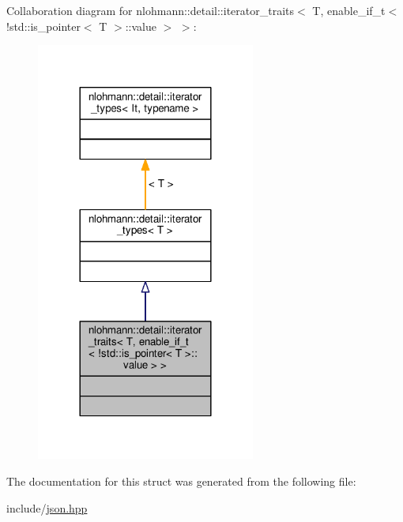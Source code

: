 Collaboration diagram for nlohmann\+:\+:detail\+:\+:iterator\+\_\+traits$<$ T, enable\+\_\+if\+\_\+t$<$ !std\+:\+:is\+\_\+pointer$<$ T $>$\+:\+:value $>$ $>$\+:
\nopagebreak
\begin{figure}[H]
\begin{center}
\leavevmode
\includegraphics[width=204pt]{structnlohmann_1_1detail_1_1iterator__traits_3_01T_00_01enable__if__t_3_01_9std_1_1is__pointer_31de627e6351fc4d3947a52fbbc938280}
\end{center}
\end{figure}


The documentation for this struct was generated from the following file\+:\begin{DoxyCompactItemize}
\item 
include/\hyperlink{json_8hpp}{json.\+hpp}\end{DoxyCompactItemize}

